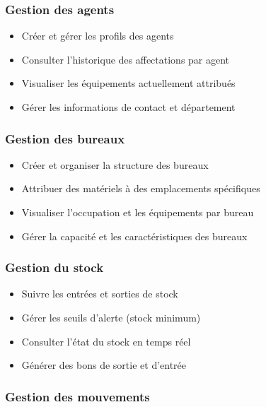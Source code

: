 \documentclass[12pt,a4paper]{report}
\begin{document}
\subsubsection{Gestion des agents}

\begin{itemize}
    \item Créer et gérer les profils des agents
    \item Consulter l'historique des affectations par agent
    \item Visualiser les équipements actuellement attribués
    \item Gérer les informations de contact et département
\end{itemize}

\subsubsection{Gestion des bureaux}

\begin{itemize}
    \item Créer et organiser la structure des bureaux
    \item Attribuer des matériels à des emplacements spécifiques
    \item Visualiser l'occupation et les équipements par bureau
    \item Gérer la capacité et les caractéristiques des bureaux
\end{itemize}

\subsubsection{Gestion du stock}

\begin{itemize}
    \item Suivre les entrées et sorties de stock
    \item Gérer les seuils d'alerte (stock minimum)
    \item Consulter l'état du stock en temps réel
    \item Générer des bons de sortie et d'entrée
\end{itemize}

\subsubsection{Gestion des mouvements}
\end{document}
